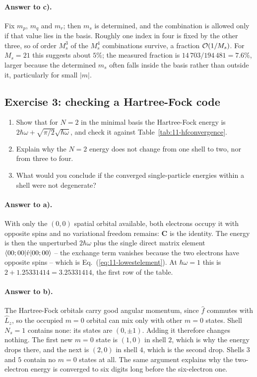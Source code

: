\paragraph{Answer to c).}
Fix $m_p$, $m_q$ and $m_r$; then $m_s$ is determined, and the combination is
allowed only if that value lies in the basis.  Roughly one index in four is
fixed by the other three, so of order $M_s^3$ of the $M_s^4$ combinations
survive, a fraction $\mathcal{O}(1/M_s)$.  For $M_s=21$ this suggests about
$5\%$; the measured fraction is $14\,703/194\,481=7.6\%$, larger because the
determined $m_s$ often falls inside the basis rather than outside it,
particularly for small $|m|$.

\subsection*{Exercise 3: checking a Hartree-Fock code}
\label{ex:11-hfcheck}

\begin{enumerate}
  \item[a)] Show that for $N=2$ in the minimal basis the Hartree-Fock energy
  is $2\hbar\omega+\sqrt{\pi/2}\sqrt{\hbar\omega}$, and check it against
  Table~\ref{tab:11-hfconvergence}.
  \item[b)] Explain why the $N=2$ energy does not change from one shell to
  two, nor from three to four.
  \item[c)] What would you conclude if the converged single-particle energies
  within a shell were not degenerate?
\end{enumerate}

\paragraph{Answer to a).}
With only the $(0,0)$ spatial orbital available, both electrons occupy it with
opposite spins and no variational freedom remains: $\bm{C}$ is the identity.
The energy is then the unperturbed $2\hbar\omega$ plus the single direct
matrix element $\langle 00;00 | \hat{v} | 00;00 \rangle$ -- the exchange term vanishes
because the two electrons have opposite spins -- which is
Eq.~(\ref{eq:11-lowestelement}).  At $\hbar\omega=1$ this is
$2+1.25331414=3.25331414$, the first row of the table.

\paragraph{Answer to b).}
The Hartree-Fock orbitals carry good angular momentum, since $\hat{f}$
commutes with $\hat{L}_z$, so the occupied $m=0$ orbital can mix only with
other $m=0$ states.  Shell $N_s=1$ contains none: its states are $(0,\pm1)$.
Adding it therefore changes nothing.  The first new $m=0$ state is $(1,0)$ in
shell $2$, which is why the energy drops there, and the next is $(2,0)$ in
shell $4$, which is the second drop.  Shells $3$ and $5$ contain no $m=0$
states at all.  The same argument explains why the two-electron energy is
converged to six digits long before the six-electron one.

